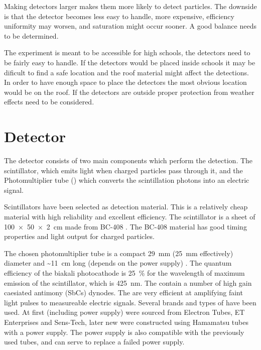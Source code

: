 Making detectors larger makes them more likely to detect particles. The downside is that the detector becomes less easy to handle, more expensive, efficiency uniformity may worsen, and saturation might occur sooner. A good balance needs to be determined.

The experiment is meant to be accessible for high schools, the detectors need to be fairly easy to handle. If the detectors would be placed inside schools it may be dificult to find a safe location and the roof material might affect the detections. In order to have enough space to place the detectors the most obvious location would be on the roof. If the detectors are outside proper protection from weather effects need to be considered.


\section{Detector}

The detector consists of two main components which perform the detection. The scintillator, which emits light when charged particles pass through it, and the Photomultiplier tube (\pmt) which converts the scintillation photons into an electric signal.

Scintillators have been selected as detection material. This is a relatively cheap material with high reliability and excellent efficiency. The scintillator is a sheet of \SI[product-units=power]{100 x 50 x 2}{\centi\meter} made from BC-408 \cite{bc408}. The BC-408 material has good timing properties and light output for charged particles.

The chosen photomultiplier tube \cite{et:pmt} is a compact \SI{29}{\milli\meter} (\SI{25}{\milli\meter} effectively) diameter and \SI{~11}{\centi\meter} long (depends on the power supply) \pmt. The quantum efficiency of the biakali photocathode is \SI{25}{\percent} for the wavelength of maximum emission of the scintillator, which is \SI{425}{\nano\meter}. The \pmts contain a number of high gain caesiated antimony (SbCs) dynodes. The \pmts are very efficient at amplifying faint light pulses to measureable electric signals. Several brands and types of \pmts have been used. At first \pmts (including power supply) were sourced from Electron Tubes, ET Enterprises and Sens-Tech, later new \pmts were constructed using Hamamatsu tubes with a \nikhef power supply. The \nikhef power supply is also compatible with the previously used tubes, and can serve to replace a failed power supply.

